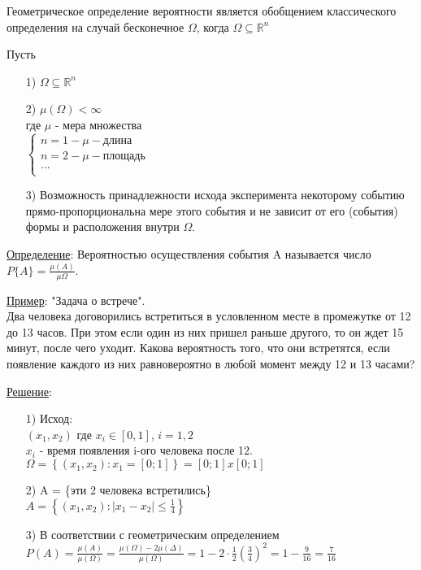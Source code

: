 
Геометрическое определение вероятности является обобщением классического определения на случай бесконечное $\Omega$, когда $\Omega \subseteq \mathbb{R}^n$

Пусть
\begin{enumerate}
	\item[1)]
	$\Omega \subseteq \mathbb{R}^n$
	
	\item[2)]
	$\mu(\Omega) < \infty$ \\
	где $\mu$ - мера множества \\
	$\begin{cases}
		n = 1 - \mu - \text{длина} \\
		n = 2 - \mu - \text{площадь} \\
		... \\
	\end{cases}$
	
	\item[3)]
	Возможность принадлежности исхода эксперимента некоторому событию прямо-пропорциональна мере этого события и не зависит от его (события) формы и расположения внутри $\Omega$.
\end{enumerate}

\underline{Определение}: Вероятностью осуществления события A называется число $P\{A\} = \frac{\mu(A)}{\mu{\Omega}}$.

\underline{Пример}: "Задача о встрече". \\
Два человека договорились встретиться в условленном месте в промежутке от 12 до 13 часов. При этом если один из них пришел раньше другого, то он ждет 15 минут, после чего уходит. Какова вероятность того, что они встретятся, если появление каждого из них равновероятно в любой момент между 12 и 13 часами?

\underline{Решение}:
\begin{enumerate}
	\item[1)]
	Исход: \\
	$(x_1, x_2)$ где $x_i \in [0,1]$, $i = 1,2$ \\
	$x_i$ - время появления i-ого человека после 12. \\
	$\Omega = \left\{ (x_1, x_2): x_1 = [0;1] \right\} = [0;1]x[0;1]$
	
	\item[2)] 
	A = \{эти 2 человека встретились\} \\
	$A = \left\{ (x_1, x_2): |x_1 - x_2| \leqslant \frac{1}{4} \right\}$
	
	\item[3)] 
	В соответствии с геометрическим определением
	$P(A) = \frac{\mu(A)}{\mu(\Omega)} = \frac{\mu(\Omega) - 2\mu(\Delta)}{\mu(\Omega)} = 1 - 2 \cdot \frac{1}{2} \left(\frac{3}{4}\right)^2 = 1 - \frac{9}{16} = \frac{7}{16}$
\end{enumerate}

